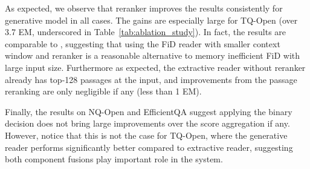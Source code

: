 \documentclass[11pt]{article}
\begin{document}
\begin{table}[t]
    \centering
    \caption{Results for different pipeline components used for score aggregation on NQ-Open a TQ-Open. See text for details.}
    \label{tab:score-aggr}
\end{table}
As expected, we observe that reranker improves the results consistently for generative model in all cases. 
The gains are especially large for TQ-Open (over 3.7 EM, underscored in Table~\ref{tab:ablation_study}). 
In fact, the results are comparable to \citet{izacard2020leveraging}, suggesting that using the FiD reader with smaller context window and reranker is a reasonable alternative to memory inefficient FiD with large input size.
Furthermore as expected, the extractive reader without reranker already has top-128 passages at the input, and improvements from the passage reranking are only negligible if any (less than 1 EM).

Finally, the results on NQ-Open and EfficientQA suggest applying the binary decision does not bring large improvements over the score aggregation if any. 
However, notice that this is not the case for TQ-Open, where the generative reader performs significantly better compared to extractive reader, suggesting both component fusions play important role in the system.
\end{document}
